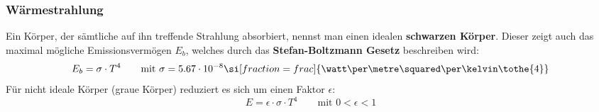 		\subsubsection{Wärmestrahlung} %
			Ein Körper, der sämtliche auf ihn treffende Strahlung absorbiert, nennst man einen idealen \textbf{schwarzen Körper}.
			Dieser zeigt auch das maximal mögliche Emissionsvermögen $E_b$, welches durch das \textbf{Stefan-Boltzmann Gesetz} beschreiben wird:
			\begin{equation*}
				E_b = \sigma \cdot T^4 \qquad \text{mit } \sigma = 5.67\cdot 10^{-8} \si[fraction=frac]{\watt\per\metre\squared\per\kelvin\tothe{4}}
			\end{equation*}
			Für nicht ideale Körper (graue Körper) reduziert es sich um einen Faktor $\epsilon$:
			\begin{equation*}
				E = \epsilon\cdot\sigma\cdot T^4 \qquad \text{mit } 0 < \epsilon < 1
			\end{equation*}
